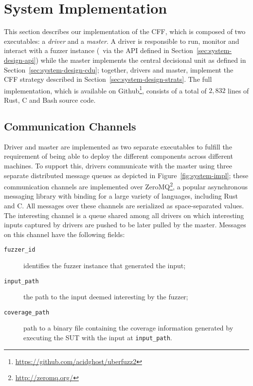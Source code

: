 \section{System Implementation}
This section describes our implementation of the \ac{CFF}, which is composed of
two executables: a \emph{driver} and a \emph{master}. A driver is responsible to
run, monitor and interact with a fuzzer instance (\ie~via the \ac{API} defined
in Section~\ref{sec:system-design-api}) while the master implements the central
decisional unit as defined in Section~\ref{sec:system-design-cdu}; together,
drivers and master, implement the \ac{CFF} strategy described in
Section~\ref{sec:system-design-strats}. The full implementation, which is
available on Github\footnote{\url{https://github.com/acidghost/uberfuzz2}},
consists of a total of $2,832$ lines of Rust, C and Bash source code.

\subsection{Communication Channels}
Driver and master are implemented as two separate executables to fulfill the
requirement of being able to deploy the different components across different
machines. To support this, drivers communicate with the master using three
separate distributed message queues as depicted in Figure~\ref{fig:system-impl};
these communication channels are implemented over
ZeroMQ\footnote{\url{http://zeromq.org/}}, a popular asynchronous messaging
library with binding for a large variety of languages, including Rust and C. All
messages over these channels are serialized as space-separated values. The
interesting channel is a queue shared among all drivers on which interesting
inputs captured by drivers are pushed to be later pulled by the master. Messages
on this channel have the following fields:

\begin{description}
    \item[\texttt{fuzzer\_id}] identifies the fuzzer instance that generated the
        input;
    \item[\texttt{input\_path}] the path to the input deemed interesting by the
        fuzzer;
    \item[\texttt{coverage\_path}] path to a binary file containing the coverage
        information generated by executing the \ac{SUT} with the input at
        \texttt{input\_path}.
\end{description}

